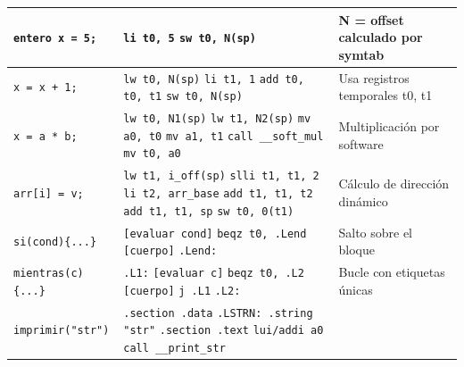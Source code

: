 \begin{longtable}{p{3cm}p{5cm}p{6cm}}
\texttt{entero x = 5;} &
\texttt{li t0, 5} \newline \texttt{sw t0, N(sp)} &
N = offset calculado por symtab \\
\midrule
\texttt{x = x + 1;} &
\texttt{lw t0, N(sp)} \newline \texttt{li t1, 1} \newline \texttt{add t0, t0, t1} \newline \texttt{sw t0, N(sp)} &
Usa registros temporales t0, t1 \\
\midrule
\texttt{x = a * b;} &
\texttt{lw t0, N1(sp)} \newline \texttt{lw t1, N2(sp)} \newline \texttt{mv a0, t0} \newline \texttt{mv a1, t1} \newline \texttt{call \_\_soft\_mul} \newline \texttt{mv t0, a0} &
Multiplicación por software \\
\midrule
\texttt{arr[i] = v;} &
\texttt{lw t1, i\_off(sp)} \newline \texttt{slli t1, t1, 2} \newline \texttt{li t2, arr\_base} \newline \texttt{add t1, t1, t2} \newline \texttt{add t1, t1, sp} \newline \texttt{sw t0, 0(t1)} &
Cálculo de dirección dinámico \\
\midrule
\texttt{si(cond)\{...\}} &
\texttt{[evaluar cond]} \newline \texttt{beqz t0, .Lend} \newline \texttt{[cuerpo]} \newline \texttt{.Lend:} &
Salto sobre el bloque \\
\midrule
\texttt{mientras(c)\{...\}} &
\texttt{.L1:} \newline \texttt{[evaluar c]} \newline \texttt{beqz t0, .L2} \newline \texttt{[cuerpo]} \newline \texttt{j .L1} \newline \texttt{.L2:} &
Bucle con etiquetas únicas \\
\midrule
\texttt{imprimir("str")} &
\texttt{.section .data} \newline \texttt{.LSTRN: .string "str"} \newline \texttt{.section .text} \newline \texttt{lui/addi a0} \newline \texttt{call \_\_print\_str} &

\end{longtable}
